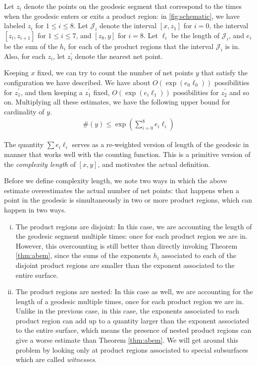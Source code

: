 Let $z_i$ denote the points on the geodesic segment that correspond to the times when the geodesic enters or exits a product region: in \autoref{fig:schematic}, we have labeled $z_i$ for $1 \leq i \leq 8$.
Let $\mathcal{J}_i$ denote the interval $[x, z_1]$ for $i=0$, the interval $[z_i, z_{i+1}]$ for $1 \leq i \leq 7$, and $[z_8, y]$ for $i=8$.
Let $\ell_i$ be the length of $\mathcal{J}_i$, and $e_i$ be the sum of the $h_i$ for each of the product regions that the interval $\mathcal{J}_i$ is in.
Also, for each $z_i$, let $z_i^{\prime}$ denote the nearest net point.

Keeping $x$ fixed, we can try to count the number of net points $y$ that satisfy the configuration we have described.
We have about $O(\exp(e_0 \ell_0))$ possibilities for $z_1^{\prime}$, and then keeping a $z_1^{\prime}$ fixed, $O(\exp(e_i \ell_1))$ possibilities for $z_2^{\prime}$ and so on.
Multiplying all these estimates, we have the following upper bound for cardinality of $y$.
\begin{align*}
  \#\left( y \right) \leq \exp\left( \sum_{i=0}^8 e_i \ell_i \right)
\end{align*}

The quantity $\sum e_i \ell_i$ serves as a re-weighted version of length of the geodesic in manner that works well with the counting function.
This is a primitive version of the \emph{complexity length} of $[x,y]$, and motivates the actual definition.

Before we define complexity length, we note two ways in which the above estimate overestimates the actual number of net points: that happens when a point in the geodesic is simultaneously in two or more product regions, which can happen in two ways.
\begin{enumerate}[(i)]
\item The product regions are disjoint: In this case, we are accounting the length of the geodesic segment multiple times: once for each product region we are in. However, this overcounting is still better than directly invoking Theorem \ref{thm:abem}, since the sums of the exponents $h_i$ associated to each of the disjoint product regions are smaller than the exponent associated to the entire surface.
\item The product regions are nested: In this case as well, we are accounting for the length of a geodesic multiple times, once for each product region we are in.
  Unlike in the previous case, in this case, the exponents associated to each product region can add up to a quantity larger than the exponent associated to the entire surface, which means the presence of nested product regions can give a worse estimate than Theorem \ref{thm:abem}.
  We will get around this problem by looking only at product regions associated to special subsurfaces which are called \emph{witnesses}.
\end{enumerate}

